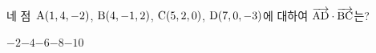 네 점~$\mathrm{A}(1{,}\mkern3mu\mathopen{}4{,}\mkern3mu\mathopen{}-2)$, $\mathrm{B}(4{,}\mkern3mu\mathopen{}-1{,}\mkern3mu\mathopen{}2)$, $\mathrm{C}(5{,}\mkern3mu\mathopen{}2{,}\mkern3mu\mathopen{}0)$, $\mathrm{D}(7{,}\mkern3mu\mathopen{}0{,}\mkern3mu\mathopen{}-3)$에 대하여 $\overrightarrow{\mathrm{AD}}\cdot\overrightarrow{\mathrm{BC}}$는?
\begin{choices32}{$-2$}{$-4$}{$-6$}{$-8$}{$-10$}\end{choices32}
